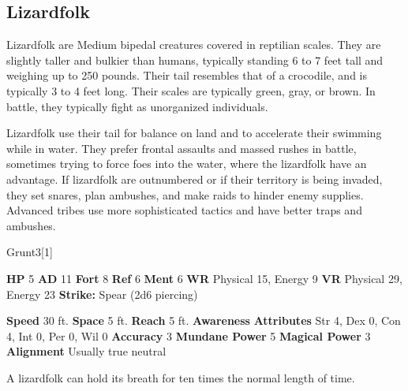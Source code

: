     \subsection{Lizardfolk}
      
      Lizardfolk are Medium bipedal creatures covered in reptilian scales.
      They are slightly taller and bulkier than humans, typically standing 6 to 7 feet tall and weighing up to 250 pounds.
      Their tail resembles that of a crocodile, and is typically 3 to 4 feet long.
      Their scales are typically green, gray, or brown.
      In battle, they typically fight as unorganized individuals.
    
      Lizardfolk use their tail for balance on land and to accelerate their swimming while in water.
      They prefer frontal assaults and massed rushes in battle, sometimes trying to force foes into the water, where the lizardfolk have an advantage.
      If lizardfolk are outnumbered or if their territory is being invaded, they set snares, plan ambushes, and make raids to hinder enemy supplies.
      Advanced tribes use more sophisticated tactics and have better traps and ambushes.
    

      
  \begin{monsubsection}{Grunt}{3}[1]
    \vspace{-1em}\vspace{-1em}
    \vspace{0em}

    
    

    \begin{spellcontent}
      \begin{spelltargetinginfo}
        \pari \textbf{HP} 5 \monsep
          \textbf{AD} 11 \monsep
          \textbf{Fort} 8 \monsep
          \textbf{Ref} 6 \monsep
          \textbf{Ment} 6
        \pari \textbf{WR} Physical 15, Energy 9 \monsep
        \textbf{VR} Physical 29, Energy 23
        \pari \textbf{Strike:}
            Spear  (2d6 piercing)
      \end{spelltargetinginfo}
    \end{spellcontent}
    \begin{monsterfooter}
      \pari \textbf{Speed} 30 ft. \monsep
        \textbf{Space} 5 ft. \monsep
        \textbf{Reach} 5 ft.
      \pari \textbf{Awareness} 
      \pari \textbf{Attributes}
        Str 4, Dex 0,
        Con 4, Int 0,
        Per 0, Wil 0
      \pari \textbf{Accuracy} 3 \monsep
        \textbf{Mundane Power} 5 \monsep
      \textbf{Magical Power} 3
      \pari \textbf{Alignment} Usually true neutral
    \end{monsterfooter}
  \end{monsubsection}
   A lizardfolk can hold its breath for ten times the normal length of time.
  

